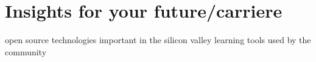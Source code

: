 \chapter{Insights for your future/carriere}
\label{ch:future}
open source technologies important in the silicon valley
learning tools used by the community
